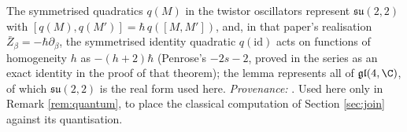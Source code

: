 The symmetrised quadratics $q(M)$ in the twistor oscillators represent $\mathfrak{su}(2,2)$ with $[q(M), q(M')] = \hbar\, q([M,M'])$, and, in that paper's realisation $\bar{Z}_{\beta} = -\hbar\partial_{\beta}$, the symmetrised identity quadratic $q(\mathrm{id})$ acts on functions of homogeneity $h$ as $-(h+2)\hbar$ (Penrose's $-2s-2$, proved in the series as an exact identity in the proof of that theorem); the lemma represents all of $\mathfrak{gl}(4,\C)$, of which $\mathfrak{su}(2,2)$ is the real form used here. \emph{Provenance:} \cite[Lem.~5.5, Thm.~5.7]{ButlerT9}. Used here only in Remark \ref{rem:quantum}, to place the classical computation of Section \ref{sec:join} against its quantisation.

